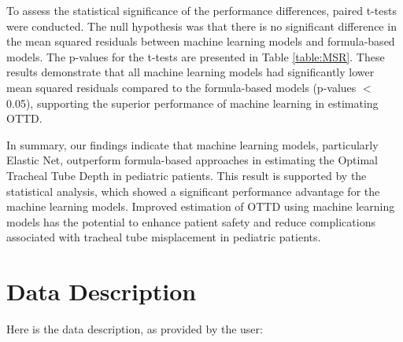 \documentclass[11pt]{article}
\begin{document}
To assess the statistical significance of the performance differences, paired t-tests were conducted. The null hypothesis was that there is no significant difference in the mean squared residuals between machine learning models and formula-based models. The p-values for the t-tests are presented in Table \ref{table:MSR}. These results demonstrate that all machine learning models had significantly lower mean squared residuals compared to the formula-based models (p-values $<$ 0.05), supporting the superior performance of machine learning in estimating OTTD.

In summary, our findings indicate that machine learning models, particularly Elastic Net, outperform formula-based approaches in estimating the Optimal Tracheal Tube Depth in pediatric patients. This result is supported by the statistical analysis, which showed a significant performance advantage for the machine learning models. Improved estimation of OTTD using machine learning models has the potential to enhance patient safety and reduce complications associated with tracheal tube misplacement in pediatric patients.


\clearpage
\appendix

\section{Data Description} \label{sec:data_description} Here is the data description, as provided by the user:
\end{document}
